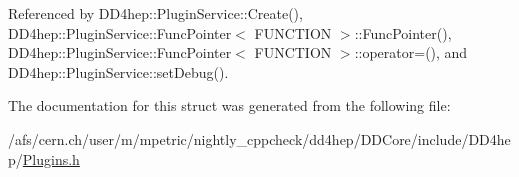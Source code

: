 Referenced by D\+D4hep\+::\+Plugin\+Service\+::\+Create(), D\+D4hep\+::\+Plugin\+Service\+::\+Func\+Pointer$<$ F\+U\+N\+C\+T\+I\+O\+N $>$\+::\+Func\+Pointer(), D\+D4hep\+::\+Plugin\+Service\+::\+Func\+Pointer$<$ F\+U\+N\+C\+T\+I\+O\+N $>$\+::operator=(), and D\+D4hep\+::\+Plugin\+Service\+::set\+Debug().



The documentation for this struct was generated from the following file\+:\begin{DoxyCompactItemize}
\item 
/afs/cern.\+ch/user/m/mpetric/nightly\+\_\+cppcheck/dd4hep/\+D\+D\+Core/include/\+D\+D4hep/\hyperlink{_plugins_8h}{Plugins.\+h}\end{DoxyCompactItemize}
